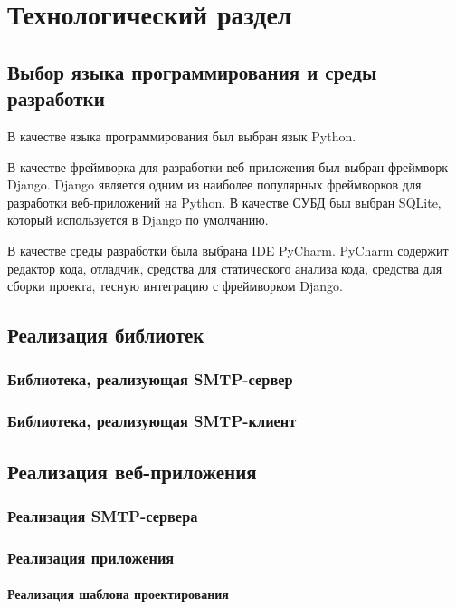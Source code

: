 \chapter{Технологический раздел}

\section{Выбор языка программирования и среды разработки}

В качестве языка программирования был выбран язык Python. 

В качестве фреймворка для разработки веб-приложения был выбран фреймворк Django. Django является одним из наиболее популярных фреймворков для разработки веб-приложений на Python. В качестве СУБД был выбран SQLite, который используется в Django по умолчанию.

В качестве среды разработки была выбрана IDE PyCharm. PyCharm содержит редактор кода, отладчик, средства для статического анализа кода, средства для сборки проекта, тесную интеграцию с фреймворком Django.

\section{Реализация библиотек}

\subsection{Библиотека, реализующая SMTP-сервер}

\subsection{Библиотека, реализующая SMTP-клиент}

\section{Реализация веб-приложения}

\subsection{Реализация SMTP-сервера}

\subsection{Реализация приложения}

\subsubsection{Реализация шаблона проектирования}


